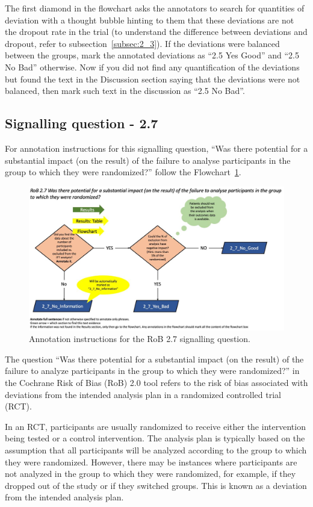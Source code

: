 \documentclass[sn-mathphys,Numbered]{sn-jnl}%
\begin{document}
The first diamond in the flowchart asks the annotators to search for quantities of deviation with a thought bubble hinting to them that these deviations are not the dropout rate in the trial (to understand the difference between deviations and dropout, refer to subsection~\ref{subsec:2_3}).
If the deviations were balanced between the groups, mark the annotated deviations as ``2.5 Yes Good'' and ``2.5 No Bad'' otherwise.
Now if you did not find any quantification of the deviations but found the text in the Discussion section saying that the deviations were not balanced, then mark such text in the discussion as ``2.5 No Bad''.
%
%
%
%
\subsection*{Signalling question - 2.7 }
%
For annotation instructions for this signalling question, ``Was there potential for a substantial impact (on the result) of the failure to analyse participants in the group to which they were randomized?'' follow the Flowchart~\ref{fig:2_7}.
%
\begin{figure}[hbt]
    \centering
    \includegraphics[width=\textwidth]{figures/2_7.jpg}
    \caption{Annotation instructions for the RoB 2.7 signalling question.}
    \label{fig:2_7}
\end{figure}


The question ``Was there potential for a substantial impact (on the result) of the failure to analyze participants in the group to which they were randomized?'' in the Cochrane Risk of Bias (RoB) 2.0 tool refers to the risk of bias associated with deviations from the intended analysis plan in a randomized controlled trial (RCT).

In an RCT, participants are usually randomized to receive either the intervention being tested or a control intervention. The analysis plan is typically based on the assumption that all participants will be analyzed according to the group to which they were randomized. However, there may be instances where participants are not analyzed in the group to which they were randomized, for example, if they dropped out of the study or if they switched groups. This is known as a deviation from the intended analysis plan.
\end{document}
